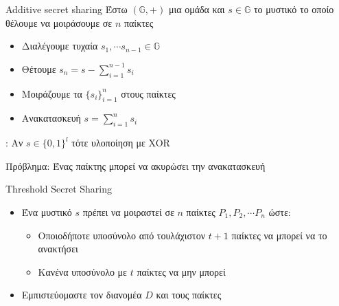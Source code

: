 \documentclass[handout]{beamer}
\begin{document}
\begin{frame}{Additive secret sharing}
Έστω $(\mathbb{G},+)$ μια ομάδα και $s \in \mathbb{G}$ το μυστικό το οποίο θέλουμε να μοιράσουμε σε $n$ παίκτες

\begin{itemize}

\pause
\item Διαλέγουμε τυχαία $s_1, \cdots s_{n-1} \in \mathbb{G}$

\pause
\item Θέτουμε $s_n = s - \sum_{i=1}^{n-1} s_i$

\pause
\item Μοιράζουμε τα $\{ s_i \}_{i=1}^n$ στους παίκτες

\pause
\item Ανακατασκευή $s = \sum_{i=1}^n s_i$
\end{itemize}

\pause
{}: Αν $s \in \{0,1\}^l$ τότε υλοποίηση με XOR

\pause
\alert{Πρόβλημα:} Ένας παίκτης μπορεί να ακυρώσει την ανακατασκευή 
\end{frame}

\begin{frame}{Threshold Secret Sharing}
\begin{itemize}
\item Ένα μυστικό $s$ πρέπει να μοιραστεί σε $n$ παίκτες $P_1, P_2, \cdots P_n$ ώστε:
\pause
\begin{itemize}
\item Οποιοδήποτε υποσύνολο από τουλάχιστον $t+1$ παίκτες να μπορεί να το ανακτήσει
\pause
\item Κανένα υποσύνολο με $t$ παίκτες να μην μπορεί
\pause
\end{itemize}
\item {} Εμπιστεύομαστε τον διανομέα $D$ και τους παίκτες
\end{itemize}
\end{frame}
\end{document}
